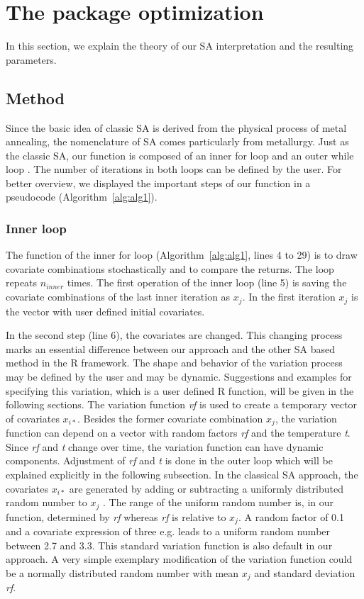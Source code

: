 \section{The package optimization}
In this section, we explain the theory of our SA interpretation and the resulting parameters.

\subsection{Method}
\label{subsec:method}
Since the basic idea of classic SA is derived from the physical process of metal annealing, the nomenclature of SA comes particularly from metallurgy. Just as the classic SA, our function is composed of an inner for loop and an outer while loop \citep{kirkpatrick_1983}. The number of iterations in both loops can be defined by the user. For better overview, we displayed the important steps of our function in a pseudocode (Algorithm~\ref{alg:alg1}).

\subsubsection{Inner loop}
The function of the inner for loop (Algorithm~\ref{alg:alg1}, lines 4 to 29) is to draw covariate combinations stochastically and to compare the returns. The loop repeats  $n_{inner}$  times. The first operation of the inner loop (line 5) is saving the covariate combinations of the last inner iteration as $x_j$. In the first iteration  $x_j$ is the vector with user defined initial covariates.

In the second step (line 6), the covariates are changed. This changing process marks an essential difference between our approach and the other SA based method in the R framework.  The shape and behavior of the variation process may be defined by the user and may be dynamic. Suggestions and examples for specifying this variation, which is a user defined R function, will be given in the following sections. The variation function \textit{vf} is used to create a temporary vector of covariates $x_{i*}$. Besides the former covariate combination $x_j$, the variation function can depend on a vector with random factors \textit{rf} and the temperature \textit{t}. Since \textit{rf} and \textit{t} change over time, the variation function can have dynamic components. Adjustment of \textit{rf} and \textit{t} is done in the outer loop which will be explained explicitly in the following subsection. In the classical SA approach, the covariates $x_{i*}$ are generated by adding or subtracting a uniformly distributed random number to $x_j$ \citep{kirkpatrick_1983}. The range of the uniform random number is, in our function, determined by \textit{rf} whereas \textit{rf} is relative to $x_j$. A random factor of 0.1 and a covariate expression of three e.g. leads to a uniform random number between 2.7 and 3.3. This standard variation function is also default in our approach. A very simple exemplary modification of the variation function could be a normally distributed random number with mean $x_j$ and standard deviation \textit{rf}.

